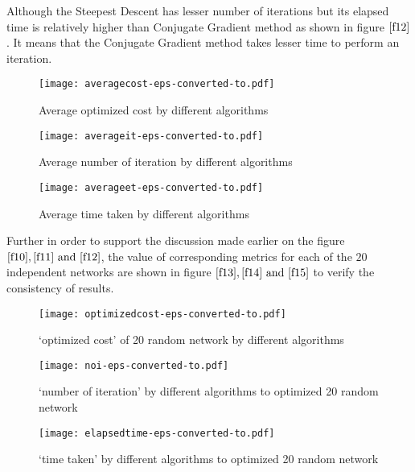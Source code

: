 \documentclass[11pt]{article}
\numberwithin{equation}{section}
\begin{document}
Although the Steepest Descent has lesser number of iterations but its elapsed time is relatively higher than Conjugate Gradient method as shown in figure $\ref{f12}$. It means that the Conjugate Gradient method takes lesser time to perform an iteration.\\

\begin{figure*}[htb!]
\begin{center}
\texttt{[image: averagecost-eps-converted-to.pdf]}
\end{center}
\caption{Average optimized cost by different algorithms}\label{f10}
\end{figure*}
\begin{figure*}[htb!]
\begin{center}
\texttt{[image: averageit-eps-converted-to.pdf]}
\end{center}
\caption{Average number of iteration by different algorithms}\label{f11}
\end{figure*}
\newpage
\begin{figure*}[htb!]
\begin{center}
\texttt{[image: averageet-eps-converted-to.pdf]}
\end{center}
\caption{Average time taken by different algorithms}\label{f12}
\end{figure*}
Further in order to support the discussion made earlier on the figure $\ref{f10},\ref{f11}~ \text{and}~\ref{f12}$, the value of corresponding metrics for each of the $20$ independent networks are shown in figure $\ref{f13},\ref{f14}~ \text{and}~\ref{f15}$ to verify the consistency of results.\\

\begin{figure*}[htb!]
\begin{center}
\texttt{[image: optimizedcost-eps-converted-to.pdf]}
\end{center}
\caption{`optimized cost' of 20 random network by different algorithms}\label{f13}
\end{figure*}
\begin{figure*}[htb!]
\begin{center}
\texttt{[image: noi-eps-converted-to.pdf]}
\end{center}
\caption{`number of iteration' by different algorithms to optimized 20 random network }\label{f14}
\end{figure*}
\begin{figure*}[htb!]
\begin{center}
\texttt{[image: elapsedtime-eps-converted-to.pdf]}
\end{center}
\caption{`time taken' by different algorithms to optimized 20 random network}\label{f15}
\end{figure*}
\end{document}
